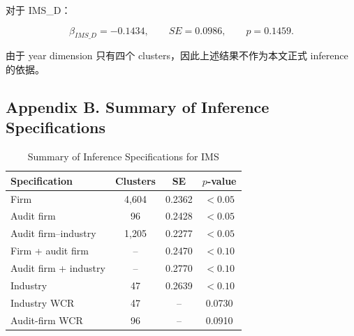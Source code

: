 \documentclass[11pt]{article}
\begin{document}
对于 IMS\_D：

\[
\beta_{IMS\_D}=-0.1434,\qquad SE=0.0986,\qquad p=0.1459.
\]

由于 year dimension 只有四个 clusters，因此上述结果不作为本文正式 inference 的依据。

\subsection{Appendix B. Summary of Inference Specifications}

\begin{table}[htbp]
\centering
\caption{Summary of Inference Specifications for IMS}
\begin{tabular}{lccc}
\toprule
Specification & Clusters & SE & $p$-value \\
\midrule
Firm & 4,604 & 0.2362 & $<0.05$ \\
Audit firm & 96 & 0.2428 & $<0.05$ \\
Audit firm--industry & 1,205 & 0.2277 & $<0.05$ \\
Firm + audit firm & -- & 0.2470 & $<0.10$ \\
Audit firm + industry & -- & 0.2770 & $<0.10$ \\
Industry & 47 & 0.2639 & $<0.10$ \\
Industry WCR & 47 & -- & 0.0730 \\
Audit-firm WCR & 96 & -- & 0.0910 \\
\bottomrule
\end{tabular}
\end{table}
\end{document}
